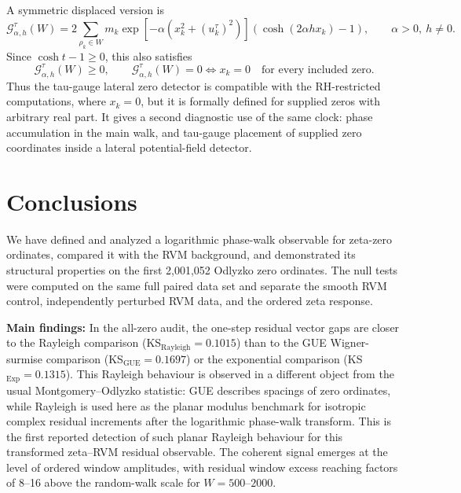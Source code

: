 \documentclass[12pt]{article}
\numberwithin{equation}{section}
\begin{document}
\noindent A symmetric displaced version is
\begin{equation}
\mathcal G_{\alpha,h}^{\tau}(W)
=
2\sum_{\rho_k\in W}
m_k
\exp\left[-\alpha\left(x_k^2+(u_k^{\tau})^2\right)\right]
\left(\cosh(2\alpha h x_k)-1\right),
\qquad \alpha>0,\ h\neq0.
\label{eq:gemini_tau_lateral_moment}
\end{equation}
Since \(\cosh t-1\geq0\), this also satisfies
\begin{equation}
\mathcal G_{\alpha,h}^{\tau}(W)\geq0,
\qquad
\mathcal G_{\alpha,h}^{\tau}(W)=0
\Longleftrightarrow
x_k=0
\quad\text{for every included zero}.
\label{eq:gemini_tau_lateral_moment_zero_criterion}
\end{equation}
Thus the tau-gauge lateral zero detector is compatible with the RH-restricted computations, where \(x_k=0\), but it is formally defined for supplied zeros with arbitrary real part.  It gives a second diagnostic use of the same clock: phase accumulation in the main walk, and tau-gauge placement of supplied zero coordinates inside a lateral potential-field detector.


\section{Conclusions}
\label{sec:conclusion}

We have defined and analyzed a logarithmic phase-walk observable for zeta-zero ordinates, compared it with the RVM background, and demonstrated its structural properties on the first 2,001,052 Odlyzko zero ordinates.  The null tests were computed on the same full paired data set and separate the smooth RVM control, independently perturbed RVM data, and the ordered zeta response.

\textbf{Main findings:} In the all-zero audit, the one-step residual vector gaps are closer to the Rayleigh comparison (KS$_{\text{Rayleigh}}=0.1015$) than to the GUE Wigner-surmise comparison (KS$_{\text{GUE}}=0.1697$) or the exponential comparison (KS$_{\text{Exp}}=0.1315$). This Rayleigh behaviour is observed in a different object from the usual Montgomery--Odlyzko statistic: GUE describes spacings of zero ordinates, while Rayleigh is used here as the planar modulus benchmark for isotropic complex residual increments after the logarithmic phase-walk transform. This is the first reported detection of such planar Rayleigh behaviour for this transformed zeta--RVM residual observable. The coherent signal emerges at the level of ordered window amplitudes, with residual window excess reaching factors of 8--16 above the random-walk scale for $W=500$--$2000$.
\end{document}
